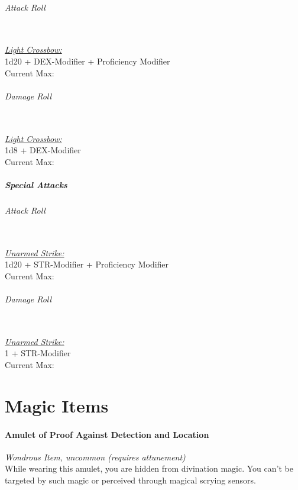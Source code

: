 \documentclass[letterpaper,openany,oneside,twocolumn]{book}
\begin{document}
\paragraph*{Attack Roll}\hfill\\
\underline{\textit{Light Crossbow:}}\\
1d20 + DEX-Modifier + Proficiency Modifier\\
\indent Current Max: 
\paragraph*{Damage Roll}\hfill\\
\underline{\textit{Light Crossbow:}}\\
1d8 + DEX-Modifier\\
\indent Current Max: 
\subsubsection*{Special Attacks}
\paragraph*{Attack Roll}\hfill\\
\underline{\textit{Unarmed Strike:}}\\
1d20 + STR-Modifier + Proficiency Modifier\\
\indent Current Max: 
\paragraph*{Damage Roll}\hfill\\
\underline{\textit{Unarmed Strike:}}\\
1 + STR-Modifier\\
\indent Current Max: 

\part*{Magic Items}

\subsection*{Amulet of Proof Against Detection and Location}
\textit{Wondrous Item, uncommon (requires attunement)}\\
While wearing this amulet, you are hidden from divination magic. You can't be targeted by such magic or perceived through magical scrying sensors.
\end{document}
